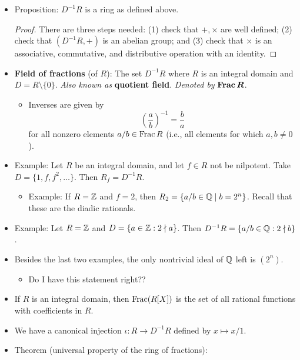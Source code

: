 \documentclass[../notes.tex]{subfiles}
\begin{document}
\begin{itemize}
\begin{itemize}
    \end{itemize}
    \item Proposition: $D^{-1}R$ is a ring as defined above.
    \begin{proof}
        There are three steps needed: (1) check that $+,\times$ are well defined; (2) check that $(D^{-1}R,+)$ is an abelian group; and (3) check that $\times$ is an associative, commutative, and distributive operation with an identity.
    \end{proof}
    \item \textbf{Field of fractions} (of $R$): The set $D^{-1}R$ where $R$ is an integral domain and $D=R\setminus\{0\}$. \emph{Also known as} \textbf{quotient field}. \emph{Denoted by} $\bm{\Frac R}$.
    \begin{itemize}
        \item Inverses are given by
        \begin{equation*}
            \left( \frac{a}{b} \right)^{-1} = \frac{b}{a}
        \end{equation*}
        for all nonzero elements $a/b\in\operatorname{Frac} R$ (i.e., all elements for which $a,b\neq 0$).
    \end{itemize}
    \item Example: Let $R$ be an integral domain, and let $f\in R$ not be nilpotent. Take $D=\{1,f,f^2,\dots\}$. Then $R_f=D^{-1}R$.
    \begin{itemize}
        \item Example: If $R=\mathbb{Z}$ and $f=2$, then $R_2=\{a/b\in\mathbb{Q}\mid b=2^n\}$. Recall that these are the diadic rationals.
    \end{itemize}
    \item Example: Let $R=\mathbb{Z}$ and $D=\{a\in\mathbb{Z}:2\nmid a\}$. Then $D^{-1}R=\{a/b\in\mathbb{Q}:2\nmid b\}$.
    \item Besides the last two examples, the only nontrivial ideal of $\mathbb{Q}$ left is $(2^n)$.
    \begin{itemize}
        \item Do I have this statement right??
    \end{itemize}
    \item If $R$ is an integral domain, then $\operatorname{Frac}(R[X])$ is the set of all rational functions with coefficients in $R$.
    \item We have a canonical injection $\iota:R\to D^{-1}R$ defined by $x\mapsto x/1$.
    \item Theorem (universal property of the ring of fractions):
    \begin{figure}[H]
        \centering
\end{figure}
\end{itemize}
\end{document}
